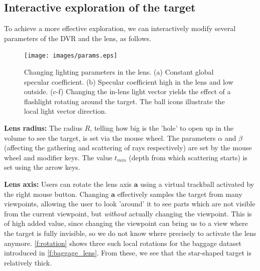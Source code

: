 \subsection{Interactive exploration of the target}
\label{sec:inter_expl}
%
To achieve a more effective exploration, we can interactively modify several parameters of the DVR and the lens, as follows.
%
\begin{figure}
\centering

\texttt{[image: images/params.eps]}

\caption{Changing lighting parameters in the lens. (a) Constant global specular coefficient. (b) Specular coefficient high in the lens and low outside. (c-f) Changing the in-lens light vector yields the effect of a flashlight rotating around the target. The ball icons illustrate the local light vector direction.}
\label{f:params}

\end{figure}
%



\par \textbf{Lens radius:} The radius $R$, telling how big is the 'hole' to open up in the volume to see the target, is set via the mouse wheel. The parameters $\alpha$ and $\beta$ (affecting the gathering and scattering of rays respectively) are set by the mouse wheel and modifier keys. The value $t_{min}$ (depth from which scattering starts) is set using the arrow keys.

\par  \textbf{Lens axis:} Users can rotate the lens axis $\mathbf{a}$ using a virtual trackball activated by the right mouse button. Changing $\mathbf{a}$ effectively samples the target from many viewpoints, allowing the user to look 'around' it to see parts which are not visible from the current viewpoint, but \emph{without} actually changing the viewpoint. This is of high added value, since changing the viewpoint can bring us to a view where the target is fully invisible, so we do not know where precisely to activate the lens anymore. \autoref{f:rotation} shows three such local rotations for the baggage dataset introduced in  \autoref{f:baggage_lens}. From these, we see that the star-shaped target is relatively thick.



